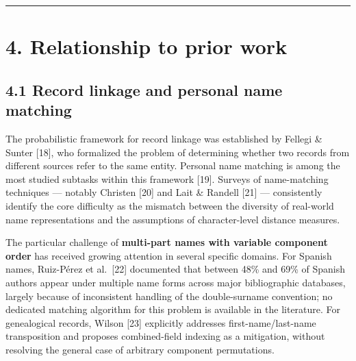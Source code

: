 \documentclass[
  11pt,
]{article}
\begin{document}
\begin{center}\rule{0.5\linewidth}{0.5pt}\end{center}

\section{4. Relationship to prior
work}\label{relationship-to-prior-work}

\subsection{4.1 Record linkage and personal name
matching}\label{record-linkage-and-personal-name-matching}

The probabilistic framework for record linkage was established by
Fellegi \& Sunter {[}18{]}, who formalized the problem of determining
whether two records from different sources refer to the same entity.
Personal name matching is among the most studied subtasks within this
framework {[}19{]}. Surveys of name-matching techniques --- notably
Christen {[}20{]} and Lait \& Randell {[}21{]} --- consistently identify
the core difficulty as the mismatch between the diversity of real-world
name representations and the assumptions of character-level distance
measures.

The particular challenge of \textbf{multi-part names with variable
component order} has received growing attention in several specific
domains. For Spanish names, Ruiz-P\'erez et al.~{[}22{]} documented that
between 48\% and 69\% of Spanish authors appear under multiple name
forms across major bibliographic databases, largely because of
inconsistent handling of the double-surname convention; no dedicated
matching algorithm for this problem is available in the literature. For
genealogical records, Wilson {[}23{]} explicitly addresses
first-name/last-name transposition and proposes combined-field indexing
as a mitigation, without resolving the general case of arbitrary
component permutations.
\end{document}
